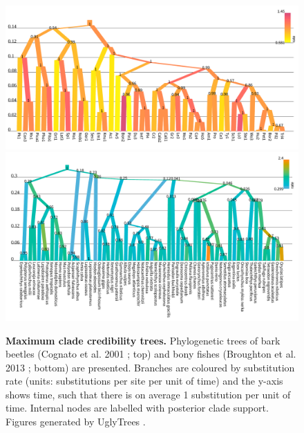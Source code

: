 \documentclass[10pt,letterpaper]{article}
\begin{document}





\begin{figure}[!h]
\includegraphics[width=\textwidth]{Figures/cognato.pdf}
\includegraphics[width=\textwidth]{Figures/broughton.pdf}
\caption{\textbf{Maximum clade credibility trees.} 
Phylogenetic trees of bark beetles (Cognato et al. 2001 \cite{Cognato_2001}; top) and bony fishes (Broughton et al. 2013 \cite{Broughton_2013}; bottom) are presented. 
Branches are coloured by substitution rate (units: substitutions per site per unit of time) and the y-axis shows time, such that there is on average 1 substitution per unit of time.
 Internal nodes are labelled with posterior clade support. Figures generated by UglyTrees \cite{uglytrees}.  }
\label{fig:parameterisationResults}
\end{figure}
\end{document}
